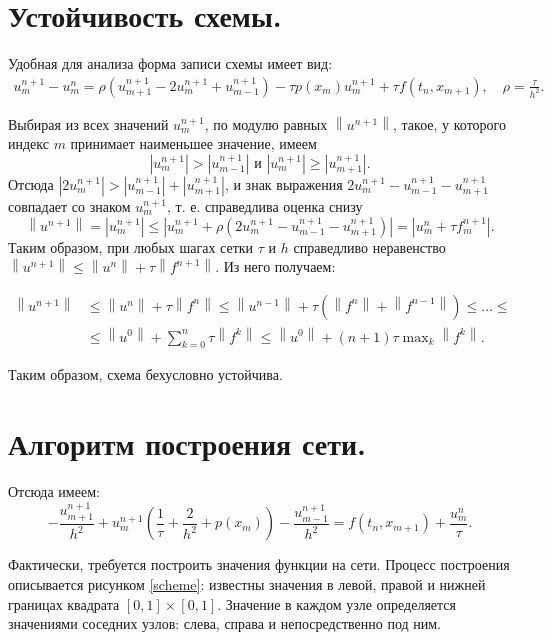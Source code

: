\documentclass[14pt,a4paper]{extarticle}
\newcommand{\1}{\mathbbm{1}}
\begin{document}
\section{Устойчивость схемы.}
Удобная для анализа форма записи схемы имеет вид:
\begin{align*}
    u_m^{n+1} - u_m^n = \rho (u_{m+1}^{n+1} - 2 u_{m}^{n+1} + u_{m-1}^{n+1}) - \tau p(x_m) u_m^{n+1} + \tau f(t_{n}, x_{m+1}), \quad \rho = \frac{\tau}{h^2}.
\end{align*}

Выбирая из всех значений $u_m^{n+1}$, по модулю равных $\left\|u^{n+1}\right\|$, такое, у которого индекс $m$ принимает наименьшее значение, имеем
$$
\left|u_m^{n+1}\right|>\left|u_{m-1}^{n+1}\right| \text { и }\left|u_m^{n+1}\right| \geqslant\left|u_{m+1}^{n+1}\right| .
$$
Отсюда $\left|2 u_m^{n+1}\right|>\left|u_{m-1}^{n+1}\right|+\left|u_{m+1}^{n+1}\right|$, и знак выражения $2 u_m^{n+1}-u_{m-1}^{n+1}-u_{m+1}^{n+1}$ совпадает со знаком $u_m^{n+1}$, т. е. справедлива оценка снизу
$$
\left\|u^{n+1}\right\|=\left|u_m^{n+1}\right| \leq \left|u_m^{n+1}+\rho\left(2 u_m^{n+1}-u_{m-1}^{n+1}-u_{m+1}^{n+1}\right)\right|=\left|u_m^n+\tau f_m^{n+1}\right| .
$$
Таким образом, при любых шагах сетки $\tau$ и $h$ справедливо неравенство $\left\|u^{n+1}\right\| \leq \left\|u^n\right\|+\tau\left\|f^{n+1}\right\|$. Из него 
получаем:

$\begin{aligned}\left\|u^{n+1}\right\| & \leq \left\|u^n\right\| +\tau\left\|f^n\right\| 
     \leq \left\|u^{n-1}\right\|+\tau\left(\left\|f^n\right\|+\left\|f^{n-1}\right\|\right) 
    \leq  \ldots \leq \\ &\leq \left\|u^0\right\|+\sum_{k=0}^n \tau\left\|f^k\right\|
    \leq \left\|u^0\right\|+(n+1) \tau \max _k\left\|f^k\right\| .\end{aligned}$

Таким образом, схема бехусловно устойчива.

\section{Алгоритм построения сети.}
Отсюда имеем:
\begin{equation*} \label{scheme1}
    -\frac{u_{m+1}^{n+1}}{h^2} + u_m^{n+1} (\frac{1}{\tau} 
    + \frac{2}{h^2} + p(x_m)) - \frac{u_{m-1}^{n+1}}{h^2} = f(t_{n}, x_{m+1}) + \frac{u_m^n}{\tau}.
\end{equation*}

Фактически, требуется построить значения функции на сети. Процесс построения описывается рисунком \ref{scheme}: 
известны значения в левой, правой и нижней границах квадрата $[0,1] \times [0, 1]$. Значение в каждом узле определяется
значениями соседних узлов: слева, справа и непосредственно под ним. 
\end{document}
